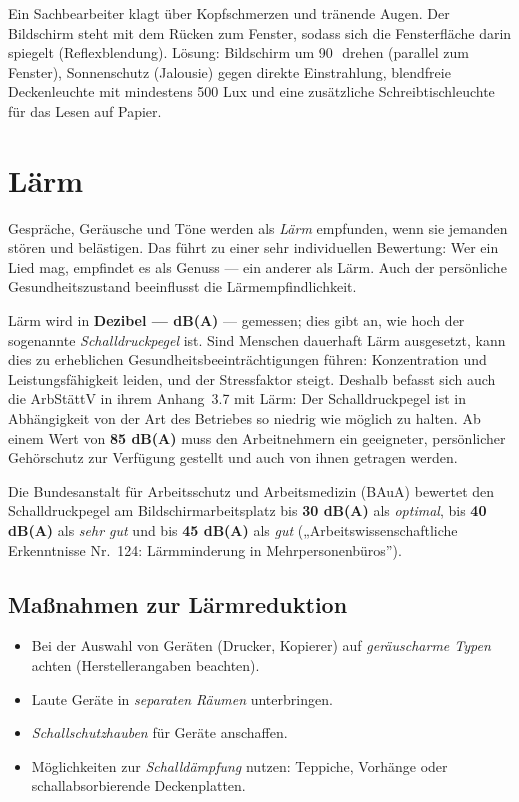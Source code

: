 \documentclass[11pt, a4paper]{article}
\begin{document}
\begin{beispiel}
Ein Sachbearbeiter klagt über Kopfschmerzen und tränende Augen. Der Bildschirm steht mit
dem Rücken zum Fenster, sodass sich die Fensterfläche darin spiegelt (Reflexblendung).
Lösung: Bildschirm um 90\,\textdegree\ drehen (parallel zum Fenster), Sonnenschutz
(Jalousie) gegen direkte Einstrahlung, blendfreie Deckenleuchte mit mindestens 500 Lux
und eine zusätzliche Schreibtischleuchte für das Lesen auf Papier.
\end{beispiel}

\section{Lärm}

Gespräche, Geräusche und Töne werden als \emph{Lärm} empfunden, wenn sie jemanden stören
und belästigen. Das führt zu einer sehr individuellen Bewertung: Wer ein Lied mag,
empfindet es als Genuss --- ein anderer als Lärm. Auch der persönliche
Gesundheitszustand beeinflusst die Lärmempfindlichkeit.

Lärm wird in \textbf{Dezibel --- dB(A)} --- gemessen; dies gibt an, wie hoch der
sogenannte \emph{Schalldruckpegel} ist. Sind Menschen dauerhaft Lärm ausgesetzt, kann
dies zu erheblichen Gesundheitsbeeinträchtigungen führen: Konzentration und
Leistungsfähigkeit leiden, und der Stressfaktor steigt. Deshalb befasst sich auch die
ArbStättV in ihrem Anhang~3.7 mit Lärm: Der Schalldruckpegel ist in Abhängigkeit von der
Art des Betriebes so niedrig wie möglich zu halten. Ab einem Wert von
\textbf{85 dB(A)} muss den Arbeitnehmern ein geeigneter, persönlicher Gehörschutz zur
Verfügung gestellt und auch von ihnen getragen werden.

\begin{merksatz}
Die Bundesanstalt für Arbeitsschutz und Arbeitsmedizin (BAuA) bewertet den
Schalldruckpegel am Bildschirmarbeitsplatz bis \textbf{30 dB(A)} als \emph{optimal}, bis
\textbf{40 dB(A)} als \emph{sehr gut} und bis \textbf{45 dB(A)} als \emph{gut}
(„Arbeitswissenschaftliche Erkenntnisse Nr.~124: Lärmminderung in Mehrpersonenbüros”).
\end{merksatz}

\subsection{Maßnahmen zur Lärmreduktion}

\begin{itemize}
  \item Bei der Auswahl von Geräten (Drucker, Kopierer) auf \emph{geräuscharme Typen}
    achten (Herstellerangaben beachten).
  \item Laute Geräte in \emph{separaten Räumen} unterbringen.
  \item \emph{Schallschutzhauben} für Geräte anschaffen.
  \item Möglichkeiten zur \emph{Schalldämpfung} nutzen: Teppiche, Vorhänge oder
    schallabsorbierende Deckenplatten.
\end{itemize}
\end{document}
